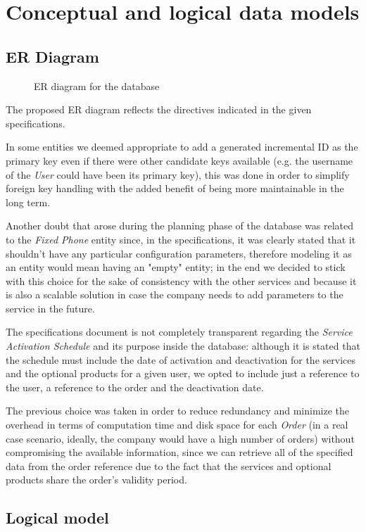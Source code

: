 
\chapter{Conceptual and logical data models}
\label{chap:data_models}


\section{ER Diagram}
\label{sec:er_diagram}

\begin{figure}[h]
    \centering
    \centerline{}
    \caption{ER diagram for the database}
    \label{fig:er_diagram}
\end{figure}

The proposed ER diagram reflects the directives indicated in the given specifications.

In some entities we deemed appropriate to add a generated incremental ID as the primary key even if there were other candidate keys available (e.g. the username of the \textit{User} could have been its primary key), this was done in order to simplify foreign key handling with the added benefit of being more maintainable in the long term.

Another doubt that arose during the planning phase of the database was related to the \textit{Fixed Phone} entity since, in the specifications, it was clearly stated that it shouldn't have any particular configuration parameters, therefore modeling it as an entity would mean having an "empty" entity; in the end we decided to stick with this choice for the sake of consistency with the other services and because it is also a scalable solution in case the company needs to add parameters to the service in the future.

The specifications document is not completely transparent regarding the \textit{Service Activation Schedule} and its purpose inside the database: although it is stated that the schedule must include the date of activation and deactivation for the services and the optional products for a given user, we opted to include just a reference to the user, a reference to the order and the deactivation date.

The previous choice was taken in order to reduce redundancy and minimize the overhead in terms of computation time and disk space for each \textit{Order} (in a real case scenario, ideally, the company would have a high number of orders) without compromising the available information, since we can retrieve all of the specified data from the order reference due to the fact that the services and optional products share the order's validity period.


\section{Logical model}
\label{sec:logical_model}


\blindtext

